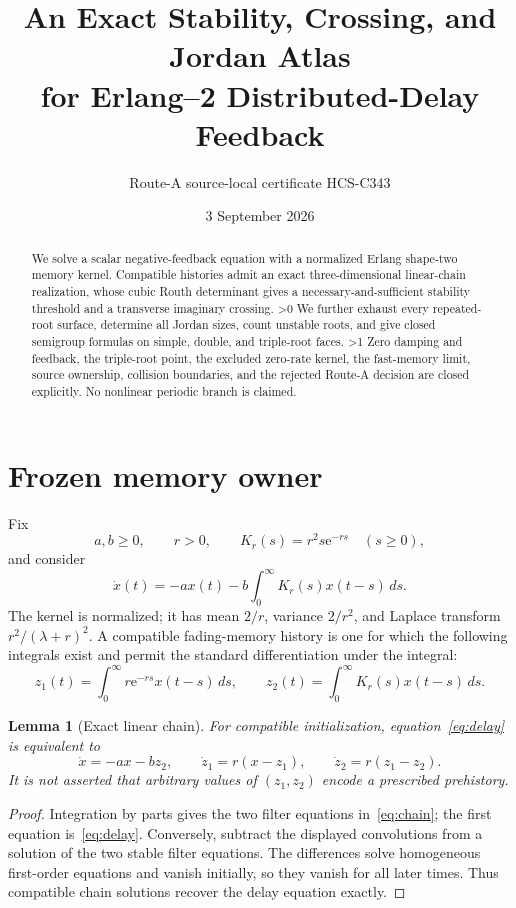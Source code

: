 \documentclass[9pt]{extarticle}
\title{An Exact Stability, Crossing, and Jordan Atlas\\
for Erlang--2 Distributed-Delay Feedback}
\author{Route-A source-local certificate HCS-C343}
\date{3 September 2026}
\providecommand{\CRevisionRound}{2}
\newtheorem{lemma}[theorem]{Lemma}
\newcommand{\ee}{\mathrm e}
\begin{document}
\maketitle
\begin{abstract}
We solve a scalar negative-feedback equation with a normalized Erlang
shape-two memory kernel.  Compatible histories admit an exact
three-dimensional linear-chain realization, whose cubic Routh determinant
gives a necessary-and-sufficient stability threshold and a transverse
imaginary crossing.
\ifnum\CRevisionRound>0
We further exhaust every repeated-root surface, determine all Jordan sizes,
count unstable roots, and give closed semigroup formulas on simple, double,
and triple-root faces.
\fi
\ifnum\CRevisionRound>1
Zero damping and feedback, the triple-root point, the excluded zero-rate
kernel, the fast-memory limit, source ownership, collision boundaries, and
the rejected Route-A decision are closed explicitly.  No nonlinear periodic
branch is claimed.
\fi
\end{abstract}

\section{Frozen memory owner}
Fix
\[
 a,b\geq0,\qquad r>0,\qquad
 K_r(s)=r^2s\ee^{-rs}\quad(s\geq0),
\]
and consider
\begin{equation}\label{eq:delay}
 \dot x(t)=-a x(t)-b\int_0^\infty K_r(s)x(t-s)\,ds .
\end{equation}
The kernel is normalized; it has mean $2/r$, variance $2/r^2$, and Laplace
transform $r^2/(\lambda+r)^2$.  A compatible fading-memory history is one
for which the following integrals exist and permit the standard
differentiation under the integral:
\[
 z_1(t)=\int_0^\infty r\ee^{-rs}x(t-s)\,ds,\qquad
 z_2(t)=\int_0^\infty K_r(s)x(t-s)\,ds.
\]

\begin{lemma}[Exact linear chain]\label{lem:chain}
For compatible initialization, equation~\eqref{eq:delay} is equivalent to
\begin{equation}\label{eq:chain}
 \dot x=-ax-bz_2,\qquad
 \dot z_1=r(x-z_1),\qquad
 \dot z_2=r(z_1-z_2).
\end{equation}
It is not asserted that arbitrary values of $(z_1,z_2)$ encode a prescribed
prehistory.
\end{lemma}

\begin{proof}
Integration by parts gives the two filter equations in~\eqref{eq:chain};
the first equation is~\eqref{eq:delay}.  Conversely, subtract the displayed
convolutions from a solution of the two stable filter equations.  The
differences solve homogeneous first-order equations and vanish initially,
so they vanish for all later times.  Thus compatible chain solutions recover
the delay equation exactly.
\end{proof}
\end{document}
